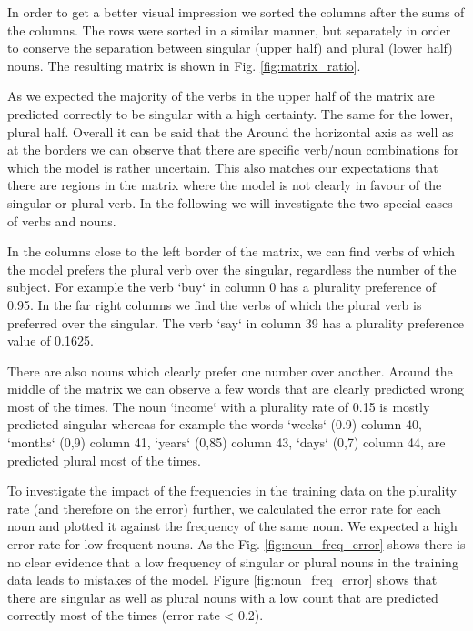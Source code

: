 In order to get a better visual impression we sorted the columns after the sums of the columns. The rows were sorted in a similar manner, but separately in order to conserve the separation between singular (upper half) and plural (lower half) nouns. The resulting matrix is shown in Fig. \ref{fig:matrix_ratio}.

As we expected the majority of the verbs in the upper half of the matrix are predicted correctly to be singular with a high certainty. The same for the lower, plural half. Overall it can be said that the Around the horizontal axis as well as at the borders we can observe that there are specific verb/noun combinations for which the model is rather uncertain. This also matches our expectations that there are regions in the matrix where the model is not clearly in favour of the singular or plural verb. In the following we will investigate the two special cases of verbs and nouns. 

In the columns close to the left border of the matrix, we can find verbs of which the model prefers the plural verb over the singular, regardless the number of the subject. For example the verb `buy` in column 0 has a plurality preference of 0.95. In the far right columns we find the verbs of which the plural verb is preferred over the singular. The verb `say` in column 39 has a plurality preference value of 0.1625.

There are also nouns which clearly prefer one number over another. Around the middle of the matrix we can observe a few words that are clearly predicted wrong most of the times. The noun `income` with a plurality rate of 0.15 is mostly predicted singular whereas for example the words `weeks` (0.9) column 40, `months` (0,9) column 41, `years` (0,85) column 43, `days` (0,7) column 44, are predicted plural most of the times.

To investigate the impact of the frequencies in the training data on the plurality rate (and therefore on the error) further, we calculated the error rate for each noun and plotted it against the frequency of the same noun. We expected a high error rate for low frequent nouns. As the Fig. \ref{fig:noun_freq_error} shows there is no clear evidence that a low frequency of singular or plural nouns in the training data leads to mistakes of the model. Figure \ref{fig:noun_freq_error} shows that there are singular as well as plural nouns with a low count that are predicted correctly most of the times (error rate < 0.2). 

